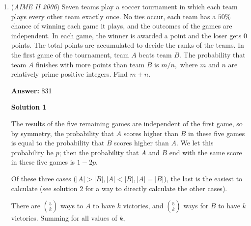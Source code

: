 \begin{enumerate}
 We then attempt to find the slope of $t_1$ and $t_2$, knowing they go through $R$ and $S$. We can quickly see that the right triangle formed by the tangential point of the radius of $\mathcal{C}_3$ and $t_2$, the centre of $\mathcal{C}_3$, and $S$ is a 30-60-90 degree triangle. The slope of this line is $\tan(60^\circ)$ (positive in the third quadrant), which is $\sqrt{3}$, and so the slope of $t_2$ is $-\frac{1}{\sqrt{3}}$. We know it passes through $S(16,0)$, so the equation of $t_2$ is $y = -\frac{1}{\sqrt{3}}x + \frac{16}{\sqrt{3}}$. Now, $t_1$ is where things get slightly trickier. Luckily, all we have to do is find $-\tan(RO_1R_1)$, which is just $-\sqrt{15}$. It follows that the slope of $t_1$ is just $\frac{1}{\sqrt{15}}$, and it passes through $R(4,0)$, so the equation of line $t_1$ is $y = \frac{1}{\sqrt{15}}x - \frac{4}{\sqrt{15}}$. Solving for the intersection $(x,y)$, the solution is $(x,y) = (19-3\sqrt{5}, \sqrt{15}- \sqrt{3})$, so $x = 19 - 3\sqrt{5}$. The requested value is $19+3+5 = \boxed{027}$.

 


	\item (\textit{AIME II 2006}) Seven teams play a soccer tournament in which each team plays every other team exactly once. No ties occur, each team has a $50\%$ chance of winning each game it plays, and the outcomes of the games are independent. In each game, the winner is awarded a point and the loser gets 0 points. The total points are accumulated to decide the ranks of the teams. In the first game of the tournament, team $A$ beats team $B.$ The probability that team $A$ finishes with more points than team $B$ is $m/n,$ where $m$ and $n$ are relatively prime positive integers. Find $m+n.$

 \textbf{Answer: }831



\textbf{Solution 1}

The results of the five remaining games are independent of the first game, so by symmetry, the probability that $A$ scores higher than $B$ in these five games is equal to the probability that $B$ scores higher than $A$. We let this probability be $p$; then the probability that $A$ and $B$ end with the same score in these five games is $1-2p$.

 Of these three cases ($|A| > |B|, |A| < |B|, |A|=|B|$), the last is the easiest to calculate (see solution 2 for a way to directly calculate the other cases). 

 There are ${5\choose k}$ ways to $A$ to have $k$ victories, and ${5\choose k}$ ways for $B$ to have $k$ victories. Summing for all values of $k$,


\end{enumerate}
